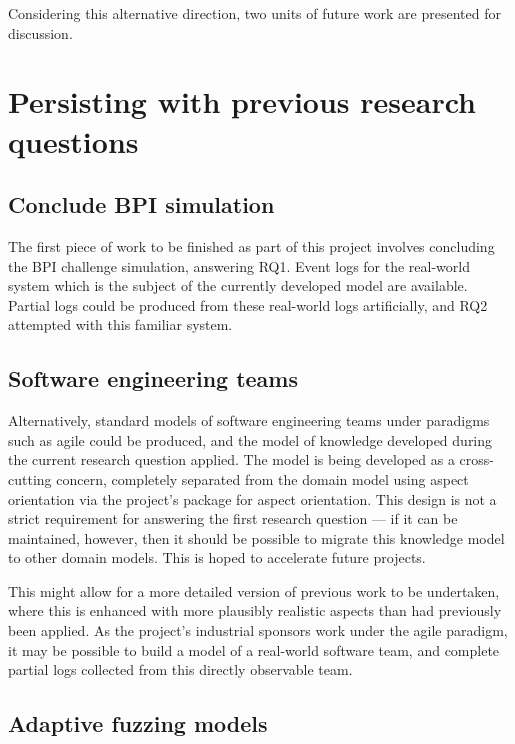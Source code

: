 \documentclass[11pt]{article}
\begin{document}
Considering this alternative direction, two units of future work are presented
for discussion.

\section{Persisting with previous research questions}
\label{sec:org5bc56db}
\label{sec:old_questions}

\subsection{Conclude BPI simulation}
\label{sec:org729ae06}
The first piece of work to be finished as part of this project involves
concluding the BPI challenge simulation, answering RQ1. Event logs for
the real-world system which is the subject of the currently developed model are
available\cite{van3536bpi}. Partial logs could be produced from these real-world
logs artificially, and RQ2 attempted with this familiar system.

\subsection{Software engineering teams}
\label{sec:org44d0ad0}
\label{subsec:agile_modelling_suggestion}

Alternatively, standard models of software engineering teams under paradigms
such as agile\cite{reference_agile_model} could be produced, and the model of
knowledge\cite{hanakawa} developed during the current research question applied. The model is
being developed as a cross-cutting concern, completely separated from the domain
model using aspect orientation via the project's package for aspect
orientation\cite{asp_repo}. This design is not a strict requirement for
answering the first research question --- if it can be maintained, however, then
it should be possible to migrate this knowledge model to other domain models.
This is hoped to accelerate future projects.\par

This might allow for a more detailed version of previous work\cite{pdsf_paper}
to be undertaken, where this is enhanced with more plausibly realistic aspects
than had previously been applied. As the project's industrial sponsors work
under the agile paradigm, it may be possible to build a model of a real-world
software team, and complete partial logs collected from this directly observable
team.


\subsection{Adaptive fuzzing models}
\label{sec:org42fcbf2}
\end{document}
